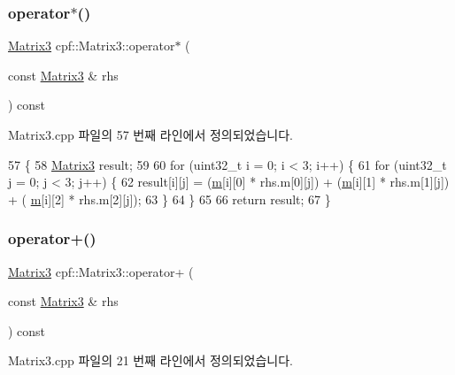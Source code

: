 \subsubsection{\texorpdfstring{operator$\ast$()}{operator*()}}
{\footnotesize\ttfamily \hyperlink{classcpf_1_1_matrix3}{Matrix3} cpf\+::\+Matrix3\+::operator$\ast$ (\begin{DoxyParamCaption}\item[{const \hyperlink{classcpf_1_1_matrix3}{Matrix3} \&}]{rhs }\end{DoxyParamCaption}) const}



Matrix3.\+cpp 파일의 57 번째 라인에서 정의되었습니다.


\begin{DoxyCode}
57                                                         \{
58         \hyperlink{classcpf_1_1_matrix3_a449a9e860e87c053355379869430cbb7}{Matrix3} result;
59 
60         \textcolor{keywordflow}{for} (uint32\_t i = 0; i < 3; i++) \{
61             \textcolor{keywordflow}{for} (uint32\_t j = 0; j < 3; j++) \{
62                 result[i][j] = (\hyperlink{classcpf_1_1_matrix3_a544955e219e5edd0c933f5e83dde9fac}{m}[i][0] * rhs.m[0][j]) + (\hyperlink{classcpf_1_1_matrix3_a544955e219e5edd0c933f5e83dde9fac}{m}[i][1] * rhs.m[1][j]) + (
      \hyperlink{classcpf_1_1_matrix3_a544955e219e5edd0c933f5e83dde9fac}{m}[i][2] * rhs.m[2][j]);
63             \}
64         \}
65 
66         \textcolor{keywordflow}{return} result;
67     \}
\end{DoxyCode}
\mbox{\label{classcpf_1_1_matrix3_aefaf91ae875e992ac59e8bb504b63a02}} 
\subsubsection{\texorpdfstring{operator+()}{operator+()}}
{\footnotesize\ttfamily \hyperlink{classcpf_1_1_matrix3}{Matrix3} cpf\+::\+Matrix3\+::operator+ (\begin{DoxyParamCaption}\item[{const \hyperlink{classcpf_1_1_matrix3}{Matrix3} \&}]{rhs }\end{DoxyParamCaption}) const}



Matrix3.\+cpp 파일의 21 번째 라인에서 정의되었습니다.


